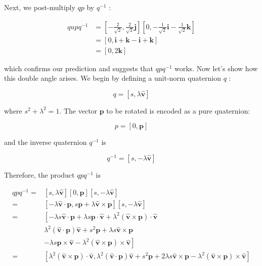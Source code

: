 Next, we post-multiply $q p$ by $q^{-1}$ :

$$
\begin{aligned}
q u p q^{-1} & =\left[-\frac{2}{\sqrt{2}}, \frac{2}{\sqrt{2}} \mathbf{j}\right]\left[0,-\frac{1}{\sqrt{2}} \mathbf{i}-\frac{1}{\sqrt{2}} \mathbf{k}\right] \\
& =[0, \mathbf{i}+\mathbf{k}-\mathbf{i}+\mathbf{k}] \\
& =[0,2 \mathbf{k}]
\end{aligned}
$$

which confirms our prediction and suggests that $q p q^{-1}$ works. Now let's show how this double angle arises. We begin by defining a unit-norm quaternion $q$ :

$$
q=[s, \lambda \hat{\mathbf{v}}]
$$

where $s^{2}+\lambda^{2}=1$. The vector $\mathbf{p}$ to be rotated is encoded as a pure quaternion:

$$
p=[0, \mathbf{p}]
$$

and the inverse quaternion $q^{-1}$ is

$$
q^{-1}=[s,-\lambda \hat{\mathbf{v}}]
$$

Therefore, the product $q p q^{-1}$ is

$$
\begin{aligned}
q p q^{-1}= & {[s, \lambda \hat{\mathbf{v}}][0, \mathbf{p}][s,-\lambda \hat{\mathbf{v}}] } \\
= & {[-\lambda \hat{\mathbf{v}} \cdot \mathbf{p}, s \mathbf{p}+\lambda \hat{\mathbf{v}} \times \mathbf{p}][s,-\lambda \hat{\mathbf{v}}] } \\
= & {\left[-\lambda s \hat{\mathbf{v}} \cdot \mathbf{p}+\lambda s \mathbf{p} \cdot \hat{\mathbf{v}}+\lambda^{2}(\hat{\mathbf{v}} \times \mathbf{p}) \cdot \hat{\mathbf{v}}\right.} \\
& \lambda^{2}(\hat{\mathbf{v}} \cdot \mathbf{p}) \hat{\mathbf{v}}+s^{2} \mathbf{p}+\lambda s \hat{\mathbf{v}} \times \mathbf{p} \\
& \left.-\lambda s \mathbf{p} \times \hat{\mathbf{v}}-\lambda^{2}(\hat{\mathbf{v}} \times \mathbf{p}) \times \hat{\mathbf{v}}\right] \\
= & {\left[\lambda^{2}(\hat{\mathbf{v}} \times \mathbf{p}) \cdot \hat{\mathbf{v}}, \lambda^{2}(\hat{\mathbf{v}} \cdot \mathbf{p}) \hat{\mathbf{v}}+s^{2} \mathbf{p}+2 \lambda s \hat{\mathbf{v}} \times \mathbf{p}-\lambda^{2}(\hat{\mathbf{v}} \times \mathbf{p}) \times \hat{\mathbf{v}}\right] }
\end{aligned}
$$

